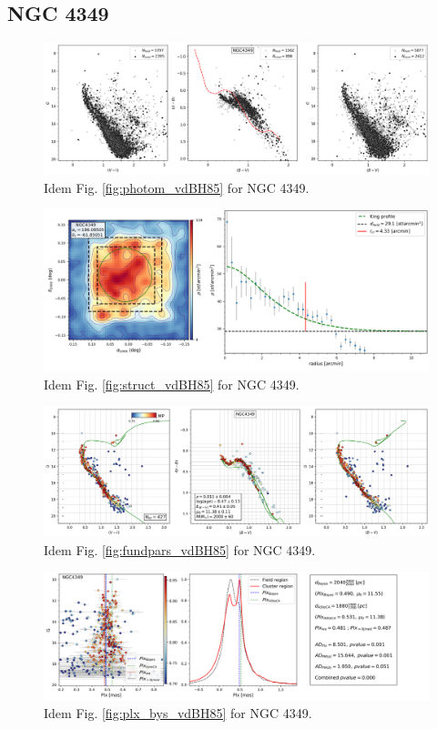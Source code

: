 \documentclass[draft]{aa}
\begin{document}
\subsection{NGC 4349}

\begin{figure}[ht]
    \centering
    \includegraphics[width=\hsize]{../figs/obs_NGC4349.png}
    \caption{Idem Fig. \ref{fig:photom_vdBH85} for NGC 4349.}
    \label{fig63}
\end{figure}
\begin{figure}[ht]
    \centering
    \includegraphics[width=\hsize]{../figs/dmap_ngc4349.png}
    \caption{Idem Fig. \ref{fig:struct_vdBH85} for NGC 4349.}
    \label{fig64}
\end{figure}
\begin{figure}[ht]
    \centering
    \includegraphics[width=\hsize]{../figs/cmds_ngc4349.png}
    \caption{Idem Fig. \ref{fig:fundpars_vdBH85} for NGC 4349.}
    \label{fig65}
\end{figure}
\begin{figure}[ht]
    \centering
    \includegraphics[width=\hsize]{../figs/plx_NGC4349.png}
    \caption{Idem Fig. \ref{fig:plx_bys_vdBH85} for NGC 4349.}
    \label{fig:plx_bys_NGC4349}
\end{figure}
\end{document}

